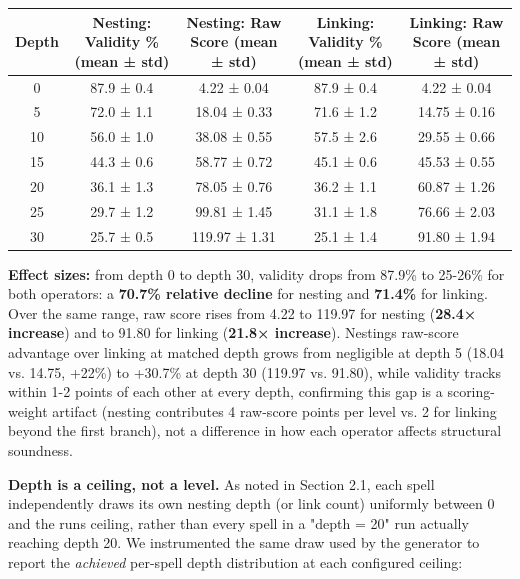 \documentclass[
  10pt,
  twocolumn]{article}
\begin{document}
\begin{table}[t]
\centering
\begin{tabular}{@{}ccccc@{}}
\toprule
Depth & Nesting: Validity \% (mean ± std) & Nesting: Raw Score (mean ±
std) & Linking: Validity \% (mean ± std) & Linking: Raw Score (mean ±
std) \\
\midrule
0 & 87.9 ± 0.4 & 4.22 ± 0.04 & 87.9 ± 0.4 & 4.22 ± 0.04 \\
5 & 72.0 ± 1.1 & 18.04 ± 0.33 & 71.6 ± 1.2 & 14.75 ± 0.16 \\
10 & 56.0 ± 1.0 & 38.08 ± 0.55 & 57.5 ± 2.6 & 29.55 ± 0.66 \\
15 & 44.3 ± 0.6 & 58.77 ± 0.72 & 45.1 ± 0.6 & 45.53 ± 0.55 \\
20 & 36.1 ± 1.3 & 78.05 ± 0.76 & 36.2 ± 1.1 & 60.87 ± 1.26 \\
25 & 29.7 ± 1.2 & 99.81 ± 1.45 & 31.1 ± 1.8 & 76.66 ± 2.03 \\
30 & 25.7 ± 0.5 & 119.97 ± 1.31 & 25.1 ± 1.4 & 91.80 ± 1.94 \\
\bottomrule
\end{tabular}
\end{table}

\textbf{Effect sizes:} from depth 0 to depth 30, validity drops from
87.9\% to 25-26\% for both operators: a \textbf{70.7\% relative decline}
for nesting and \textbf{71.4\%} for linking. Over the same range, raw
score rises from 4.22 to 119.97 for nesting (\textbf{28.4× increase})
and to 91.80 for linking (\textbf{21.8× increase}).
Nesting\textquotesingle s raw-score advantage over linking at matched
depth grows from negligible at depth 5 (18.04 vs. 14.75, +22\%) to
+30.7\% at depth 30 (119.97 vs. 91.80), while validity tracks within 1-2
points of each other at every depth, confirming this gap is a
scoring-weight artifact (nesting contributes 4 raw-score points per
level vs. 2 for linking beyond the first branch), not a difference in
how each operator affects structural soundness.

\textbf{Depth is a ceiling, not a level.} As noted in Section 2.1, each
spell independently draws its own nesting depth (or link count)
uniformly between 0 and the run\textquotesingle s ceiling, rather than
every spell in a "depth = 20" run actually reaching depth 20. We
instrumented the same draw used by the generator to report the
\emph{achieved} per-spell depth distribution at each configured ceiling:
\end{document}
